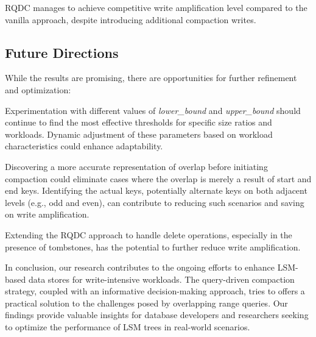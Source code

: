 RQDC manages to achieve competitive write amplification level compared to the vanilla approach, despite introducing 
additional compaction writes.

\subsection{Future Directions}

While the results are promising, there are opportunities for further refinement and optimization:

Experimentation with different values of \textit{lower\_bound} and \textit{upper\_bound} should continue to find the 
most effective thresholds for specific size ratios and workloads. Dynamic adjustment of these parameters based on 
workload characteristics could enhance adaptability.

Discovering a more accurate representation of overlap before initiating compaction could eliminate cases where the 
overlap is merely a result of start and end keys. Identifying the actual keys, potentially alternate keys on both 
adjacent levels (e.g., odd and even), can contribute to reducing such scenarios and saving on write amplification.

Extending the RQDC approach to handle delete operations, especially in the presence of tombstones, has the potential 
to further reduce write amplification.

In conclusion, our research contributes to the ongoing efforts to enhance LSM-based data stores for write-intensive 
workloads. The query-driven compaction strategy, coupled with an informative decision-making approach, tries to offers a 
practical solution to the challenges posed by overlapping range queries. Our findings provide valuable insights for 
database developers and researchers seeking to optimize the performance of LSM trees in real-world scenarios.

